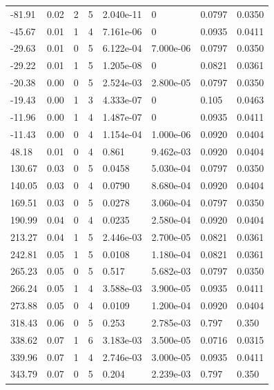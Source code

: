 \documentclass[preview]{standalone}
\begin{document}
{{\begin{tabular}{L{1.2cm}C{1.2cm} C{0.3cm}C{0.5cm} C{1.4cm}C{1.4cm} C{1.4cm}C{1.4cm}}
  -81.91  &  0.02  & 2     &  5 &  2.040e-11  & 0  & 0.0797 &  0.0350   \\ 
  -45.67  &  0.01  & 1     &  4 &  7.161e-06  & 0  & 0.0935 &  0.0411   \\ 
  -29.63  &  0.01  & 0     &  5 &  6.122e-04  & 7.000e-06  & 0.0797 &  0.0350   \\ 
  -29.22  &  0.01  & 1     &  5 &  1.205e-08  & 0  & 0.0821 &  0.0361   \\ 
  -20.38  &  0.00  & 0     &  5 &  2.524e-03  & 2.800e-05  & 0.0797 &  0.0350   \\ 
  -19.43  &  0.00  & 1     &  3 &  4.333e-07  & 0  & 0.105 &  0.0463   \\ 
  -11.96  &  0.00  & 1     &  4 &  1.487e-07  & 0  & 0.0935 &  0.0411   \\ 
  -11.43  &  0.00  & 0     &  4 &  1.154e-04  & 1.000e-06  & 0.0920 &  0.0404   \\ 
  48.18  &  0.01  & 0     &  4 &  0.861  & 9.462e-03  & 0.0920 &  0.0404   \\ 
  130.67  &  0.03  & 0     &  5 &  0.0458  & 5.030e-04  & 0.0797 &  0.0350   \\ 
  140.05  &  0.03  & 0     &  4 &  0.0790  & 8.680e-04  & 0.0920 &  0.0404   \\ 
  169.51  &  0.03  & 0     &  5 &  0.0278  & 3.060e-04  & 0.0797 &  0.0350   \\ 
  190.99  &  0.04  & 0     &  4 &  0.0235  & 2.580e-04  & 0.0920 &  0.0404   \\ 
  213.27  &  0.04  & 1     &  5 &  2.446e-03  & 2.700e-05  & 0.0821 &  0.0361   \\ 
  242.81  &  0.05  & 1     &  5 &  0.0108  & 1.180e-04  & 0.0821 &  0.0361   \\ 
  265.23  &  0.05  & 0     &  5 &  0.517  & 5.682e-03  & 0.0797 &  0.0350   \\ 
  266.24  &  0.05  & 1     &  4 &  3.588e-03  & 3.900e-05  & 0.0935 &  0.0411   \\ 
  273.88  &  0.05  & 0     &  4 &  0.0109  & 1.200e-04  & 0.0920 &  0.0404   \\ 
  318.43  &  0.06  & 0     &  5 &  0.253  & 2.785e-03  & 0.797 &  0.350   \\ 
  338.62  &  0.07  & 1     &  6 &  3.183e-03  & 3.500e-05  & 0.0716 &  0.0315   \\ 
  339.96  &  0.07  & 1     &  4 &  2.746e-03  & 3.000e-05  & 0.0935 &  0.0411   \\ 
  343.79  &  0.07  & 0     &  5 &  0.204  & 2.239e-03  & 0.797 &  0.350   \\ 

\end{tabular}}}
\end{document}
